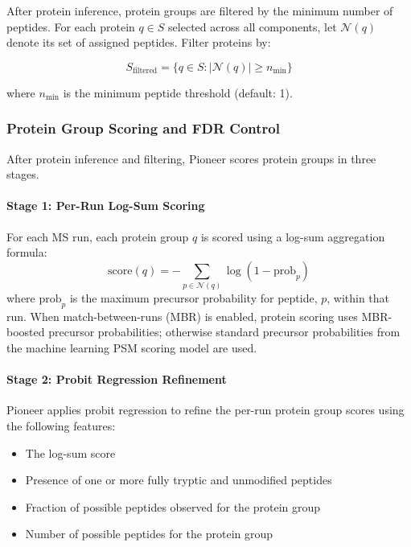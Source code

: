 \documentclass[pdflatex,sn-nature]{sn-jnl}
\begin{document}
After protein inference, protein groups are filtered by the minimum number of peptides. For each protein $q \in S$ selected across all components, let $\mathcal{N}(q)$ denote its set of assigned peptides. Filter proteins by:

\begin{equation}
S_{\text{filtered}} = \{q \in S : |\mathcal{N}(q)| \geq n_{\text{min}}\}
\end{equation}

where $n_{\text{min}}$ is the minimum peptide threshold (default: 1).

\subsubsection{Protein Group Scoring and FDR Control}\label{subsubsec:protein-group-scoring-fdr}

After protein inference and filtering, Pioneer scores protein groups in three stages. 

\paragraph{Stage 1: Per-Run Log-Sum Scoring}\label{para:stage1-per-run-log-sum-scoring} For each MS run, each protein group $q$ is scored using a log-sum aggregation formula:
\begin{equation}
\text{score}(q) = -\sum_{p \in \mathcal{N}(q)} \log(1 - \text{prob}_p)
\end{equation}
where $\text{prob}_p$ is the maximum precursor probability for peptide, $p$, within that run. When match-between-runs (MBR) is enabled, protein scoring uses MBR-boosted precursor probabilities; otherwise standard precursor probabilities from the machine learning PSM scoring model are used.

\paragraph{Stage 2: Probit Regression Refinement}\label{para:stage2-probit-regression-refinement} Pioneer applies probit regression to refine the per-run protein group scores using the following features:
\begin{itemize}
  \item The log-sum score 
  \item Presence of one or more fully tryptic and unmodified peptides
  \item Fraction of possible peptides observed for the protein group 
  \item Number of possible peptides for the protein group
\end{itemize}
\end{document}
